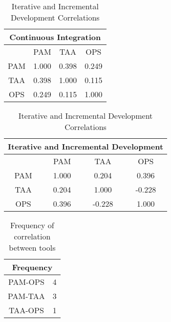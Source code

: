 \begin{table} [H]
 \RawFloats %
 \begin{minipage}{.45\textwidth}
  \caption{Continuous Integration Correlations}
  \label{table:ci_correlations}
  \begin{tabular}{| c | c | c | c | } \hline
  \multicolumn{4}{|c|}{\textbf{Continuous Integration}}  \\ \hline
   & \ac{PAM} & \ac{TAA} & \ac{OPS} \\ \hline
  \ac{PAM} & 1.000 & 0.398 & \cellcolor{green}0.249 \\ \hline
  \ac{TAA} & 0.398 & 1.000 & 0.115 \\ \hline
  \ac{OPS} & \cellcolor{green}0.249 & 0.115 & 1.000 \\ \hline
 \end{tabular}
 \end{minipage}%
%
 \begin{minipage}{.45\textwidth}
  \centering
   \caption{Iterative and Incremental Development Correlations}
  \label{table:iid_correlations}
  \begin{tabular}{| c | c | c | c |} \hline
  \multicolumn{4}{|c|}{\textbf{Iterative and Incremental Development}}  \\ \hline
  & \ac{PAM} & \ac{TAA} & \ac{OPS} \\ \hline
  \ac{PAM} & 1.000 & 0.204 & \cellcolor{green}0.396 \\ \hline
  \ac{TAA} & 0.204 & 1.000 & -0.228 \\ \hline
  \ac{OPS} & \cellcolor{green}0.396 & -0.228 & 1.000 \\ \hline
 \end{tabular}
 \end{minipage}%
\end{table}

\begin{table} [H]
	\caption{Frequency of correlation between tools}
	\label{table:correlations_frequency}
	\begin{tabular}{| c | c |} \hline
		\multicolumn{2}{|c|}{\textbf{Frequency}}  \\ \hline
		\ac{PAM}-\ac{OPS} & 4 \\ \hline
		\ac{PAM}-\ac{TAA} & 3 \\ \hline
		\ac{TAA}-\ac{OPS} & 1 \\ \hline
	\end{tabular}
\end{table}


